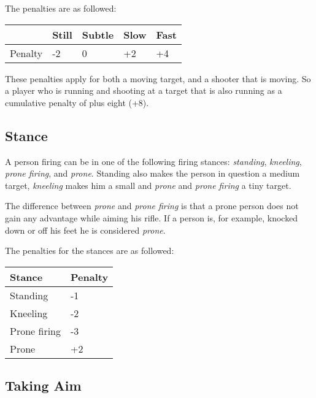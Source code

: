 The penalties are as followed:

\begin{center}
  \begin{tabular}{| l | l | l | l | l |}
    \hline
    \,      & Still & Subtle & Slow & Fast \\ \hline
    Penalty & -2    & 0      & +2   & +4   \\
    \hline
  \end{tabular}
\end{center}

These penalties apply for both a moving target, and a shooter that is moving. So
a player who is running and shooting at a target that is also running as a
cumulative penalty of plus eight (+8).

\subsection{Stance}
\label{sub:7-Stance}

A person firing can be in one of the following firing stances: \emph{standing},
\emph{kneeling}, \emph{prone firing}, and \emph{prone}. Standing also
makes the person in question a medium target, \emph{kneeling} makes
him a small and \emph{prone} and \emph{prone firing} a tiny target.

The difference between \emph{prone} and \emph{prone firing} is that a prone
person does not gain any advantage while aiming his rifle. If a person is, for
example, knocked down or off his feet he is considered \emph{prone}.

The penalties for the stances are as followed:

\begin{center}
  \begin{tabular}{| l | l |}
    \hline
    Stance        & Penalty \\ \hline
    Standing      & -1      \\ \hline
    Kneeling      & -2      \\ \hline
    Prone firing  & -3      \\ \hline
    Prone         & +2      \\ \hline
    \hline
  \end{tabular}
\end{center}

\subsection{Taking Aim}
\label{sub:7-Taking Aim}

